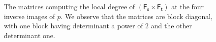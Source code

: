 \documentclass[11pt,reqno]{amsart}
\newcommand{\inputTikZ}[2]{%
     \resizebox{#1}{!}{}}
\theoremstyle{definition}
\newcommand{\Ft}{\mathsf{F_t}}
\newcommand{\Fs}{\mathsf{F_s}}
\begin{document}

\begin{figure}
    \centering
\inputTikZ{\textwidth}{Figures/matricesg2}
    \caption{The matrices computing the local degree of $(\Fs\times\Ft)$ at the four inverse images of $p$. We observe that the matrices are block diagonal, with one block having determinant a power of $2$ and the other determinant one.}
    \label{fig:matricesg2}
\end{figure}
\end{document}
